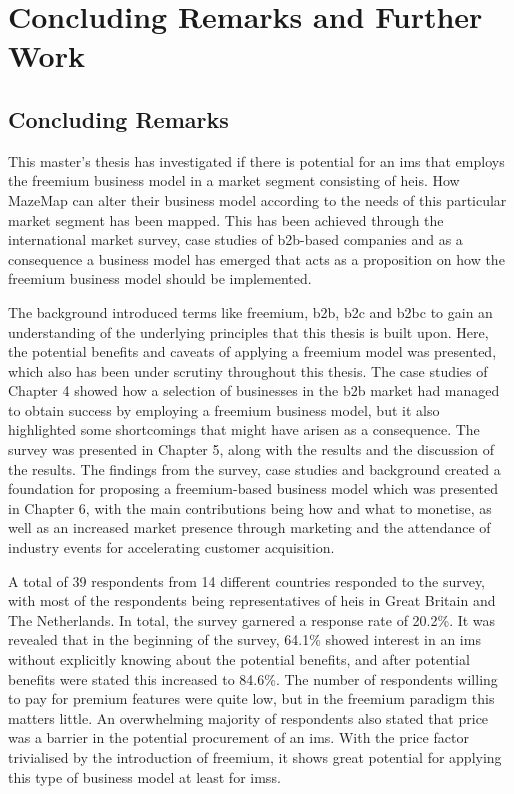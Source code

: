 \chapter{Concluding Remarks and Further Work}
\section{Concluding Remarks}
This master's thesis has investigated if there is potential for an \gls{ims} that employs the freemium business model in a market segment consisting of \glspl{hei}. How MazeMap can alter their business model according to the needs of this particular market segment has been mapped. This has been achieved through the international market survey, case studies of \gls{b2b}-based companies and as a consequence a business model has emerged that acts as a proposition on how the freemium business model should be implemented. 


The background introduced terms like freemium, \gls{b2b}, \gls{b2c} and \gls{b2bc} to gain an understanding of the underlying principles that this thesis is built upon. Here, the potential benefits and caveats of applying a freemium model was presented, which also has been under scrutiny throughout this thesis. The case studies of Chapter 4 showed how a selection of businesses in the \gls{b2b} market had managed to obtain success by employing a freemium business model, but it also highlighted some shortcomings that might have arisen as a consequence. The survey was presented in Chapter 5, along with the results and the discussion of the results. The findings from the survey, case studies and background created a foundation for proposing a freemium-based business model which was presented in Chapter 6, with the main contributions being how and what to monetise, as well as an increased market presence through marketing and the attendance of industry events for accelerating customer acquisition. 


A total of 39 respondents from 14 different countries responded to the survey, with most of the respondents being representatives of \glspl{hei} in Great Britain and The Netherlands. In total, the survey garnered a response rate of 20.2\%. It was revealed that in the beginning of the survey, 64.1\% showed interest in an \gls{ims} without explicitly knowing about the potential benefits, and after potential benefits were stated this increased to 84.6\%. The number of respondents willing to pay for premium features were quite low, but in the freemium paradigm this matters little. An overwhelming majority of respondents also stated that price was a barrier in the potential procurement of an \gls{ims}. With the price factor trivialised by the introduction of freemium, it shows great potential for applying this type of business model at least for \glspl{ims}.


